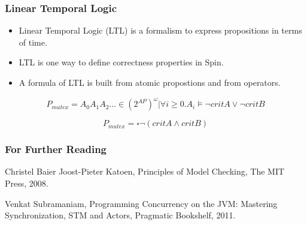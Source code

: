 \documentclass{beamer}
\begin{document}
\begin{frame}
  \frametitle{Linear Temporal Logic}
  \begin{itemize}
 \item Linear Temporal Logic (LTL) is a formalism to express propositions in terms of time.
  \item  LTL is one way to define correctness properties in Spin.
  \item A formula of LTL is built from atomic propostions and from operators.

  \end{itemize}

\[
P_{mutex} =  {A_0 A_1 A_2 \dots \in (2^{AP})^{\omega} | \forall i \geq 0. A_i \models \neg critA \lor \neg critB}
\]

\[
P_{mutex} = \square \neg (critA \land critB)
\]

\end{frame}
\begin{frame}
  \frametitle{For Further Reading}

  \begin{thebibliography}{Subramaniam, 2011}

Christel Baier Joost-Pieter Katoen,
Principles of Model Checking,
The MIT Press,
2008.

Venkat Subramaniam,
Programming Concurrency on the JVM: Mastering Synchronization, STM and Actors,
Pragmatic Bookshelf,
2011.

\end{thebibliography}
\end{frame}
\end{document}
